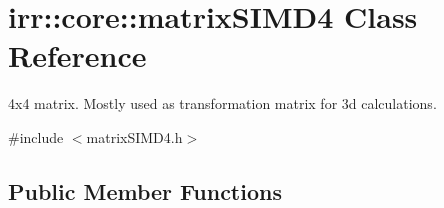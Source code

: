 \hypertarget{classirr_1_1core_1_1matrixSIMD4}{}\section{irr\+:\+:core\+:\+:matrix\+S\+I\+M\+D4 Class Reference}
\label{classirr_1_1core_1_1matrixSIMD4}


4x4 matrix. Mostly used as transformation matrix for 3d calculations.  




{\ttfamily \#include $<$matrix\+S\+I\+M\+D4.\+h$>$}

\subsection*{Public Member Functions}
